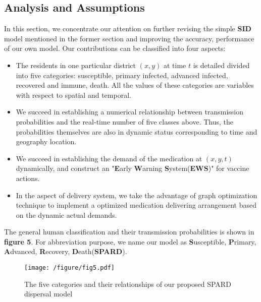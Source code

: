 \subsection{Analysis and Assumptions}
In this section, we concentrate our attention on further revising the simple \textbf{SID} model mentioned in the former section and improving the accuracy,  performance of our own model. Our contributions can be classified into four aspects:

\begin{itemize}
  \item The residents in one particular district $(x,y)$ at time $t$ is detailed divided into five categories: susceptible, primary infected, advanced infected, recovered and immune, death. All the values of these categories are variables with respect to spatial and temporal.
  \item We succeed in establishing a numerical relationship between transmission probabilities and the real-time number of five classes above. Thus, the probabilities themselves are also in dynamic status corresponding to time and geography location.
  
  \item We succeed in establishing the demand of the medication at $(x,y,t)$ dynamically, and construct an "\textbf{E}arly \textbf{W}arning \textbf{S}ystem(\textbf{EWS})" for vaccine actions.
  
  \item In the aspect of delivery system, we take the advantage of graph optimization technique to implement a optimized medication delivering  arrangement based on the dynamic actual demands.
  
 \end{itemize}
 
 The general human classification and their transmission probabilities is shown in \textbf{figure 5}. For abbreviation purpose, we name our model as \textbf{S}usceptible, \textbf{P}rimary, \textbf{A}dvanced, \textbf{R}ecovery, \textbf{D}eath(\textbf{SPARD}).
 
\begin{figure}[htbp]
\centering
\texttt{[image: /figure/fig5.pdf]}
\caption{The five categories and their relationships of our proposed SPARD dispersal model}\label{fig:5}
\end{figure}

